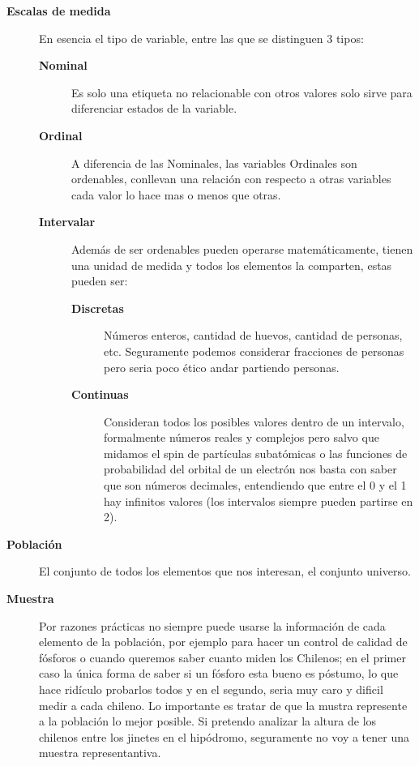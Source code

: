 \documentclass[letterpaper,10pt,openany,oneside]{sphinxmanual}
\begin{document}
\label{Estadistica:escalas-de-medida}\begin{description}
\item[{\textbf{Escalas de medida}}] \leavevmode
En esencia el tipo de variable, entre las que se distinguen 3 tipos:
\begin{description}
\item[{\textbf{Nominal}}] \leavevmode
Es solo una etiqueta no relacionable con otros valores solo sirve para diferenciar
estados de la variable.

\item[{\textbf{Ordinal}}] \leavevmode
A diferencia de las Nominales, las variables Ordinales son ordenables, conllevan una
relación con respecto a otras variables cada valor lo hace mas o menos que otras.

\item[{\textbf{Intervalar}}] \leavevmode
Además de ser ordenables pueden operarse matemáticamente, tienen una unidad de medida
y todos los elementos la comparten, estas pueden ser:
\begin{description}
\item[{\textbf{Discretas}}] \leavevmode
Números enteros, cantidad de huevos, cantidad de personas, etc. Seguramente podemos
considerar fracciones de personas pero seria poco ético andar partiendo personas.

\item[{\textbf{Continuas}}] \leavevmode
Consideran todos los posibles valores dentro de un intervalo, formalmente números
reales y complejos pero salvo que midamos el spin de partículas subatómicas o
las funciones de probabilidad del orbital de un electrón nos basta con saber que son
números decimales, entendiendo que entre el 0 y el 1 hay infinitos valores (los
intervalos siempre pueden partirse en 2).

\end{description}

\end{description}

\item[{\textbf{Población}}] \leavevmode
El conjunto de todos los elementos que nos interesan, el conjunto universo.

\item[{\textbf{Muestra}}] \leavevmode
Por razones prácticas no siempre puede usarse la información de cada elemento de la
población, por ejemplo para hacer un control de calidad de fósforos o cuando queremos
saber cuanto miden los Chilenos; en el primer caso la única forma de saber si un fósforo
esta bueno es póstumo, lo que hace ridículo probarlos todos y en el segundo, seria muy
caro y dificil medir a cada chileno. Lo importante es tratar de que la mustra represente
a la población lo mejor posible. Si pretendo analizar la altura de los chilenos entre
los jinetes en el hipódromo, seguramente no voy a tener una muestra representantiva.

\end{description}
\end{document}
